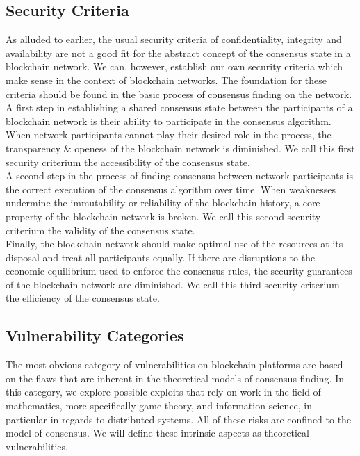 \documentclass[12pt,a4paper]{article}
\begin{document}
\subsection{Security Criteria}

As alluded to earlier, the usual security criteria of confidentiality, integrity and availability are not a good fit for the abstract concept of the consensus state in a blockchain network. We can, however, establish our own security criteria which make sense in the context of blockchain networks. The foundation for these criteria should be found in the basic process of consensus finding on the network.\\

A first step in establishing a shared consensus state between the participants of a blockchain network is their ability to participate in the consensus algorithm. When network participants cannot play their desired role in the process, the transparency \& openess of the blockchain network is diminished. We call this first security criterium the accessibility of the consensus state.\\

A second step in the process of finding consensus between network participants is the correct execution of the consensus algorithm over time. When weaknesses undermine the immutability or reliability of the blockchain history, a core property of the blockchain network is broken. We call this second security criterium the validity of the consensus state.\\

Finally, the blockchain network should make optimal use of the resources at its disposal and treat all participants equally. If there are disruptions to the economic equilibrium used to enforce the consensus rules, the security guarantees of the blockchain network are diminished. We call this third security criterium the efficiency of the consensus state.\\

\subsection{Vulnerability Categories}

The most obvious category of vulnerabilities on blockchain platforms are based on the flaws that are inherent in the theoretical models of consensus finding. In this category, we explore possible exploits that rely on work in the field of mathematics, more specifically game theory, and information science, in particular in regards to distributed systems. All of these risks are confined to the model of consensus. We will define these intrinsic aspects as theoretical vulnerabilities.\\
\end{document}

